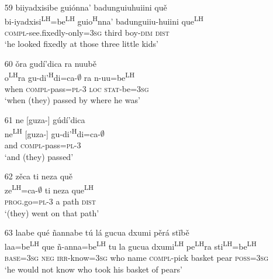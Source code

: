 \begin{itemize}
\item[59]
\glll biiyadxisibe gui\'{o}nna' badunguiuhuiini qu\v{e}\\
bi-iyadxisi\textsuperscript{LH}=be\textsuperscript{LH} guio\textsuperscript{H}nna' badunguiiu-huiini que\textsuperscript{LH}\\
\textsc{compl}-see.fixedly-only=\textsc{3sg} third boy-\textsc{dim} \textsc{dist}\\
\glt `he looked fixedly at those three little kids'


\item[60]
\glll \v{o}ra gud\'{i}'dica ra nuub\v{e}\\
o\textsuperscript{LH}ra gu-di'\textsuperscript{H}di=ca-$\emptyset$ ra n-uu=be\textsuperscript{LH}\\
when \textsc{compl}-pass=\textsc{pl}-\textsc{3} \textsc{loc} \textsc{stat}-be=\textsc{3sg}\\
\glt `when (they) passed by where he was'


\item[61]
\glll ne [guza-] g\'{u}d\'{i}'dica\\
ne\textsuperscript{LH} [guza-] gu-di'\textsuperscript{H}di=ca-$\emptyset$\\
and {} \textsc{compl}-pass=\textsc{pl}-\textsc{3}\\
\glt `and (they) passed'
 

\item[62]
\glll z\v{e}ca ti neza qu\v{e}\\
ze\textsuperscript{LH}=ca-$\emptyset$ ti neza que\textsuperscript{LH}\\
\textsc{prog}.go=\textsc{pl}-\textsc{3} a path \textsc{dist}\\
\glt `(they) went on that path'
 

\item[63]
\glll laabe qu\'{e} \~{n}annabe t\'{u} l\'{a} gucua dxumi p\v{e}r\'{a} st\v{i}b\v{e}\\
laa=be\textsuperscript{LH} que \~{n}-anna=be\textsuperscript{LH} tu la gucua dxumi\textsuperscript{LH} pe\textsuperscript{LH}ra sti\textsuperscript{LH}=be\textsuperscript{LH}\\
\textsc{base}=\textsc{3sg} \textsc{neg} \textsc{irr}-know=\textsc{3sg} who name \textsc{compl}-pick basket pear \textsc{poss}=\textsc{3sg}\\
\glt `he would not know who took his basket of pears'

\end{itemize}
